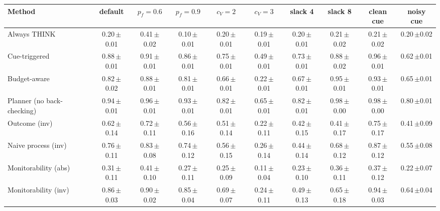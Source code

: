 \begin{tabular}{lccccccccc}
\toprule
Method & default & $p_f{=}0.6$ & $p_f{=}0.9$ & $c_V{=}2$ & $c_V{=}3$ & slack 4 & slack 8 & clean cue & noisy cue \\
\midrule
Always THINK & 0.20\,{\scriptsize$\pm$0.01} & 0.41\,{\scriptsize$\pm$0.02} & 0.10\,{\scriptsize$\pm$0.01} & 0.20\,{\scriptsize$\pm$0.01} & 0.19\,{\scriptsize$\pm$0.01} & 0.20\,{\scriptsize$\pm$0.01} & 0.21\,{\scriptsize$\pm$0.02} & 0.21\,{\scriptsize$\pm$0.02} & 0.20\,{\scriptsize$\pm$0.02} \\
Cue-triggered & 0.88\,{\scriptsize$\pm$0.01} & 0.91\,{\scriptsize$\pm$0.01} & 0.86\,{\scriptsize$\pm$0.01} & 0.75\,{\scriptsize$\pm$0.01} & 0.49\,{\scriptsize$\pm$0.01} & 0.73\,{\scriptsize$\pm$0.01} & 0.88\,{\scriptsize$\pm$0.02} & 0.96\,{\scriptsize$\pm$0.01} & 0.62\,{\scriptsize$\pm$0.01} \\
Budget-aware & 0.82\,{\scriptsize$\pm$0.02} & 0.88\,{\scriptsize$\pm$0.01} & 0.81\,{\scriptsize$\pm$0.01} & 0.66\,{\scriptsize$\pm$0.01} & 0.22\,{\scriptsize$\pm$0.01} & 0.67\,{\scriptsize$\pm$0.01} & 0.95\,{\scriptsize$\pm$0.01} & 0.93\,{\scriptsize$\pm$0.01} & 0.65\,{\scriptsize$\pm$0.01} \\
Planner (no back-checking) & 0.94\,{\scriptsize$\pm$0.01} & 0.96\,{\scriptsize$\pm$0.01} & 0.93\,{\scriptsize$\pm$0.01} & 0.82\,{\scriptsize$\pm$0.01} & 0.65\,{\scriptsize$\pm$0.01} & 0.82\,{\scriptsize$\pm$0.01} & 0.98\,{\scriptsize$\pm$0.00} & 0.98\,{\scriptsize$\pm$0.00} & 0.80\,{\scriptsize$\pm$0.01} \\
Outcome (inv) & 0.62\,{\scriptsize$\pm$0.14} & 0.72\,{\scriptsize$\pm$0.11} & 0.56\,{\scriptsize$\pm$0.16} & 0.51\,{\scriptsize$\pm$0.14} & 0.22\,{\scriptsize$\pm$0.11} & 0.42\,{\scriptsize$\pm$0.15} & 0.41\,{\scriptsize$\pm$0.17} & 0.75\,{\scriptsize$\pm$0.17} & 0.41\,{\scriptsize$\pm$0.09} \\
Naive process (inv) & 0.76\,{\scriptsize$\pm$0.11} & 0.83\,{\scriptsize$\pm$0.08} & 0.74\,{\scriptsize$\pm$0.12} & 0.56\,{\scriptsize$\pm$0.15} & 0.26\,{\scriptsize$\pm$0.14} & 0.44\,{\scriptsize$\pm$0.14} & 0.68\,{\scriptsize$\pm$0.12} & 0.87\,{\scriptsize$\pm$0.12} & 0.55\,{\scriptsize$\pm$0.08} \\
Monitorability (abs) & 0.31\,{\scriptsize$\pm$0.11} & 0.41\,{\scriptsize$\pm$0.10} & 0.27\,{\scriptsize$\pm$0.11} & 0.25\,{\scriptsize$\pm$0.09} & 0.11\,{\scriptsize$\pm$0.04} & 0.23\,{\scriptsize$\pm$0.10} & 0.36\,{\scriptsize$\pm$0.11} & 0.37\,{\scriptsize$\pm$0.12} & 0.22\,{\scriptsize$\pm$0.07} \\
Monitorability (inv) & 0.86\,{\scriptsize$\pm$0.03} & 0.90\,{\scriptsize$\pm$0.02} & 0.85\,{\scriptsize$\pm$0.04} & 0.69\,{\scriptsize$\pm$0.07} & 0.24\,{\scriptsize$\pm$0.11} & 0.49\,{\scriptsize$\pm$0.13} & 0.65\,{\scriptsize$\pm$0.18} & 0.94\,{\scriptsize$\pm$0.03} & 0.64\,{\scriptsize$\pm$0.04} \\
\bottomrule
\end{tabular}
